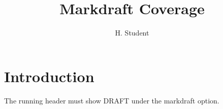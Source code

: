 \documentclass[phd,markdraft,12pt,a4paper]{bangorthesis}
\title{Markdraft Coverage}
\author{H. Student}
\begin{document}
\maketitle
\chapter{Introduction}
The running header must show DRAFT under the markdraft option.
\end{document}
